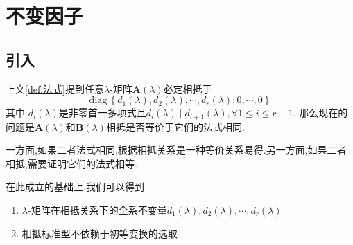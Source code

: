 \section{不变因子}
\subsection{引入}
上文\cref{def:法式}提到任意$\lambda$-矩阵$\bm{A}\left(\lambda\right)$必定相抵于
\[
\mathrm{diag}\,\left\{
    d_1\left(\lambda\right),d_2\left(\lambda\right),\cdots,d_r\left(\lambda\right);0,\cdots,0   
\right\}
\]其中
$d_i\left(\lambda\right)$是非零首一多项式且$d_i\left(\lambda\right)\mid d_{i+1}\left(\lambda\right),\forall 1\leqslant i\leqslant r-1.$
那么现在的问题是$\bm{A}\left(\lambda\right)$和$\bm{B}\left(\lambda\right)$相抵是否等价于它们的法式相同.

一方面,如果二者法式相同,根据相抵关系是一种等价关系易得.另一方面,如果二者相抵,需要证明它们的法式相等.

在此成立的基础上,我们可以得到
\begin{enumerate}[label={\textup{(\arabic*)}}]
    \item $\lambda$-矩阵在相抵关系下的全系不变量$d_1\left(\lambda\right),d_2\left(\lambda\right),\cdots,d_r\left(\lambda\right)$
    \item 相抵标准型不依赖于初等变换的选取
\end{enumerate}
